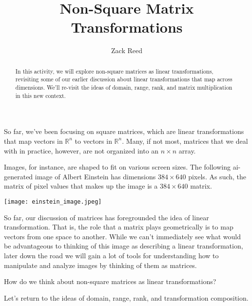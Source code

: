 \documentclass{ximera}
\author{Zack Reed}
\title{Non-Square Matrix Transformations}
\begin{document}
\begin{abstract}

In this activity, we will explore non-square matrices as linear transformations, revisiting some of our earlier discussion about linear transformations that map across dimensions. We'll re-visit the ideas of domain, range, rank, and matrix multiplication in this new context.

\end{abstract}
\maketitle


\begin{remark}

    So far, we've been focusing on square matrices, which are linear transformations that map vectors in $\mathbb{R}^n$ to vectors in $\mathbb{R}^n$. Many, if not most, matrices that we deal with in practice, however, are not organized into an $n\times n$ array.

    Images, for instance, are shaped to fit on various screen sizes. The following ai-generated image of Albert Einstein has dimensions $384\times 640$ pixels. As such, the matrix of pixel values that makes up the image is a $384\times 640$ matrix.

    \begin{center}
        \texttt{[image: einstein\_image.jpeg]}
    \end{center}

    So far, our discussion of matrices has foregrounded the idea of linear transformation. That is, the role that a matrix plays geometrically is to map vectors from one space to another. While we can't immediately see what would be advantageous to thinking of this image as describing a linear transformation, later down the road we will gain a lot of tools for understanding how to manipulate and analyze images by thinking of them as matrices.

\end{remark}

\begin{exploration}

    How do we think about non-square matrices as linear transformations? 

    Let's return to the ideas of domain, range, rank, and transformation composition. 

\end{exploration}
\end{document}
